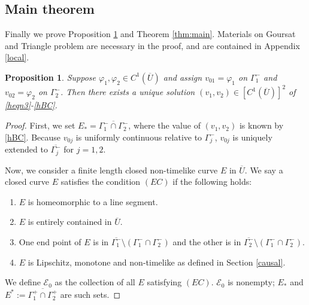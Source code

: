 \documentclass[11pt]{amsart}
\theoremstyle{plain}
\newtheorem{Prop}[Thm]{Proposition}
\theoremstyle{remark}
\numberwithin{equation}{section}
\numberwithin{Thm}{section}
\def\U{\overline{U}}
\begin{document}
\subsection{Main theorem}
Finally we prove Proposition \ref{prop:final} and Theorem \ref{thm:main}. Materials on Goursat and Triangle problem are necessary in the proof, and are contained in Appendix \ref{local}.
\begin{Prop}\label{prop:final} Suppose $\varphi_1,\varphi_2 \in C^1(\overline U)$ and assign $v_{01}=\varphi_1$ on $\Gamma_1^-$ and $v_{02}=\varphi_2$ on $\Gamma_2^-$. Then there exists a unique solution $(v_1,v_2)\in [C^1(\overline U)]^2$ of \eqref{heqn3}-\eqref{hBC}.
\end{Prop}
\begin{proof} 
First, we set $E_* = \overline{\Gamma_1^- \cap \Gamma_2^-}$, where the value of $(v_1,v_2)$ is known by \eqref{hBC}. Because $v_{0j}$ is uniformly continuous relative to $\Gamma^-_j$, $v_{0j}$ is uniquely extended to $\overline{\Gamma^-_j}$ for $j=1,2$. 

Now, we consider a finite length closed non-timelike curve $E$ in $\U$. We say a closed curve $E$ satisfies the condition $(EC)$ if the following holds:
\begin{enumerate} 
 \item $E$ is homeomorphic to a line segment.
 \item $E$ is entirely contained in $\U$.
 \item One end point of $E$ is in $\overline{\Gamma^-_1} \setminus (\Gamma_1^- \cap \Gamma_2^-)$ and the other is in $\overline{\Gamma^-_2} \setminus (\Gamma_1^- \cap \Gamma_2^-)$.
 \item $E$ is Lipschitz, monotone and non-timelike as defined in Section \ref{causal}.
\end{enumerate}
We define $\mathcal{E}_0$ as the collection of all $E$ satisfying $(EC)$. $\mathcal{E}_0$ is nonempty; $E_*$ and $E^*:=\overline{\Gamma^+_1 \cap \Gamma^+_2}$ are such sets.


\end{proof}
\end{document}
